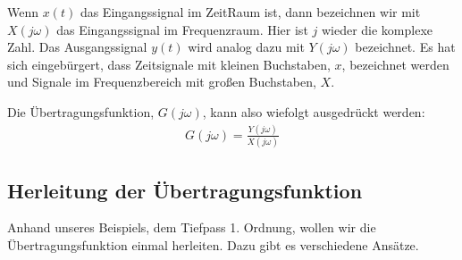 \documentclass[letterpaper,10pt,english]{jupyterBook}
\begin{document}
\sphinxAtStartPar
Wenn \(x(t)\) das Eingangssignal im Zeit\sphinxhyphen{}Raum ist, dann bezeichnen wir mit \(X(j \omega)\) das Eingangssignal im Frequenzraum. Hier ist \(j\) wieder die komplexe Zahl. Das Ausgangssignal \(y(t)\) wird analog dazu mit \(Y(j \omega)\) bezeichnet. Es hat sich eingebürgert, dass Zeitsignale mit kleinen Buchstaben, \(x\), bezeichnet werden und Signale im Frequenzbereich mit großen Buchstaben, \(X\).

\sphinxAtStartPar
Die Übertragungsfunktion, \(G(j \omega)\), kann also wiefolgt ausgedrückt werden:
\begin{equation*}
\begin{split}G(j \omega) = \frac{Y(j \omega)}{X(j \omega)}\end{split}
\end{equation*}

\subsection{Herleitung der Übertragungsfunktion}
\label{\detokenize{content/5_Uebertragungsfunktion:herleitung-der-ubertragungsfunktion}}
\sphinxAtStartPar


\sphinxAtStartPar
Anhand unseres Beispiels, dem Tiefpass 1. Ordnung, wollen wir die Übertragungsfunktion einmal herleiten. Dazu gibt es verschiedene Ansätze.
\end{document}
